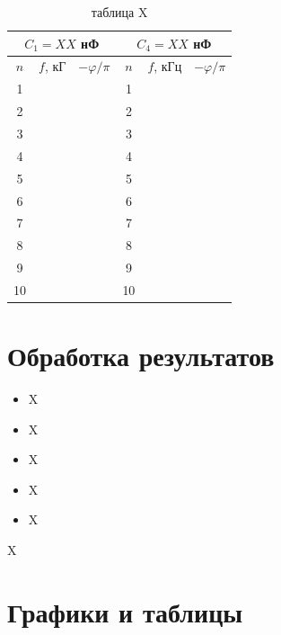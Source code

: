 \documentclass[a4paper, 12pt]{article}%
\begin{document}
\begin{enumerate}

\begin{table}[h]
\begin{center}
\begin{tabular}{|c|c|c||c|c|c|}
\hline \multicolumn{3}{|c||}{$C_{1}=XX$ нФ} & \multicolumn{3}{c|}{$C_{4}=XX$ нФ} \\
\hline$n$ & $f$, кГ & $-\varphi / \pi$ & $n$ & $f$, кГц & $-\varphi / \pi$ \\
\hline 1  &   &    & 1  &   & \\
\hline 2  &   &    & 2  &   & \\
\hline 3  &   &    & 3  &   & \\
\hline 4  &   &    & 4  &   & \\
\hline 5  &   &    & 5  &   & \\
\hline 6  &   &    & 6  &   & \\
\hline 7  &   &    & 7  &   & \\
\hline 8  &   &    & 8  &   & \\
\hline 9  &   &    & 9  &   & \\
\hline 10 &   &    & 10 &   & \\
\hline
\end{tabular}
\end{center}
\caption{таблица X}
\end{table}



\end{enumerate}
\newpage

\section{Обработка результатов}

\begin{itemize}

\item X

\item X

\item X

\item X

\item X

\end{itemize}

X

\section{Графики и таблицы}
\end{document}
